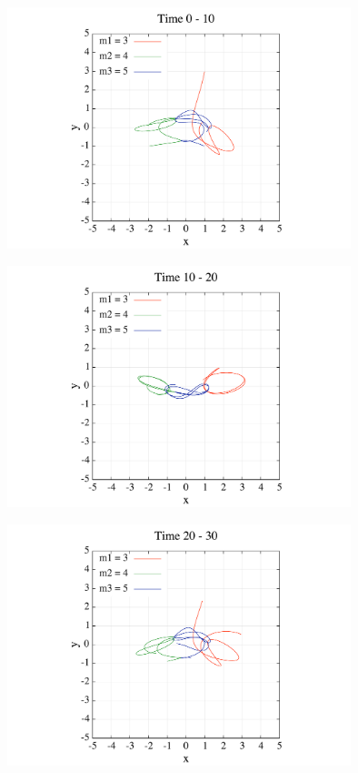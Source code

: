 \documentclass[11pt,a4paper,oneside,onecolumn]{jarticle}
\begin{document}
\begin{figure}[H]
\centering
\includegraphics[width=10cm]{./image/pythagoras_orbit_0to10.pdf}
\caption{\label{}}
\end{figure}

\begin{figure}[H]
\centering
\includegraphics[width=10cm]{./image/pythagoras_orbit_10to20.pdf}
\caption{\label{}}
\end{figure}

\begin{figure}[H]
\centering
\includegraphics[width=10cm]{./image/pythagoras_orbit_20to30.pdf}
\caption{\label{}}
\end{figure}
\end{document}
